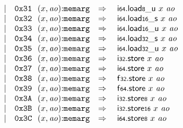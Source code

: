 $$\begin{array}[t]{@{}lrrl@{}l@{}l@{}l@{}}
& & | & \mathtt{0x31}~~(x, {\mathit{ao}}){:}{\mathtt{memarg}} & \quad\Rightarrow\quad{} & {\mathsf{i{\scriptstyle 64}}{.}\mathsf{load}}{{\mathsf{{\scriptstyle 8}}}{\mathsf{\_}}{\mathsf{u}}}~x~{\mathit{ao}} \\
& & | & \mathtt{0x32}~~(x, {\mathit{ao}}){:}{\mathtt{memarg}} & \quad\Rightarrow\quad{} & {\mathsf{i{\scriptstyle 64}}{.}\mathsf{load}}{{\mathsf{{\scriptstyle 16}}}{\mathsf{\_}}{\mathsf{s}}}~x~{\mathit{ao}} \\
& & | & \mathtt{0x33}~~(x, {\mathit{ao}}){:}{\mathtt{memarg}} & \quad\Rightarrow\quad{} & {\mathsf{i{\scriptstyle 64}}{.}\mathsf{load}}{{\mathsf{{\scriptstyle 16}}}{\mathsf{\_}}{\mathsf{u}}}~x~{\mathit{ao}} \\
& & | & \mathtt{0x34}~~(x, {\mathit{ao}}){:}{\mathtt{memarg}} & \quad\Rightarrow\quad{} & {\mathsf{i{\scriptstyle 64}}{.}\mathsf{load}}{{\mathsf{{\scriptstyle 32}}}{\mathsf{\_}}{\mathsf{s}}}~x~{\mathit{ao}} \\
& & | & \mathtt{0x35}~~(x, {\mathit{ao}}){:}{\mathtt{memarg}} & \quad\Rightarrow\quad{} & {\mathsf{i{\scriptstyle 64}}{.}\mathsf{load}}{{\mathsf{{\scriptstyle 32}}}{\mathsf{\_}}{\mathsf{u}}}~x~{\mathit{ao}} \\
& & | & \mathtt{0x36}~~(x, {\mathit{ao}}){:}{\mathtt{memarg}} & \quad\Rightarrow\quad{} & \mathsf{i{\scriptstyle 32}}{.}\mathsf{store}~x~{\mathit{ao}} \\
& & | & \mathtt{0x37}~~(x, {\mathit{ao}}){:}{\mathtt{memarg}} & \quad\Rightarrow\quad{} & \mathsf{i{\scriptstyle 64}}{.}\mathsf{store}~x~{\mathit{ao}} \\
& & | & \mathtt{0x38}~~(x, {\mathit{ao}}){:}{\mathtt{memarg}} & \quad\Rightarrow\quad{} & \mathsf{f{\scriptstyle 32}}{.}\mathsf{store}~x~{\mathit{ao}} \\
& & | & \mathtt{0x39}~~(x, {\mathit{ao}}){:}{\mathtt{memarg}} & \quad\Rightarrow\quad{} & \mathsf{f{\scriptstyle 64}}{.}\mathsf{store}~x~{\mathit{ao}} \\
& & | & \mathtt{0x3A}~~(x, {\mathit{ao}}){:}{\mathtt{memarg}} & \quad\Rightarrow\quad{} & {\mathsf{i{\scriptstyle 32}}{.}\mathsf{store}}{\mathsf{{\scriptstyle 8}}}~x~{\mathit{ao}} \\
& & | & \mathtt{0x3B}~~(x, {\mathit{ao}}){:}{\mathtt{memarg}} & \quad\Rightarrow\quad{} & {\mathsf{i{\scriptstyle 32}}{.}\mathsf{store}}{\mathsf{{\scriptstyle 16}}}~x~{\mathit{ao}} \\
& & | & \mathtt{0x3C}~~(x, {\mathit{ao}}){:}{\mathtt{memarg}} & \quad\Rightarrow\quad{} & {\mathsf{i{\scriptstyle 64}}{.}\mathsf{store}}{\mathsf{{\scriptstyle 8}}}~x~{\mathit{ao}} \\

\end{array}$$
